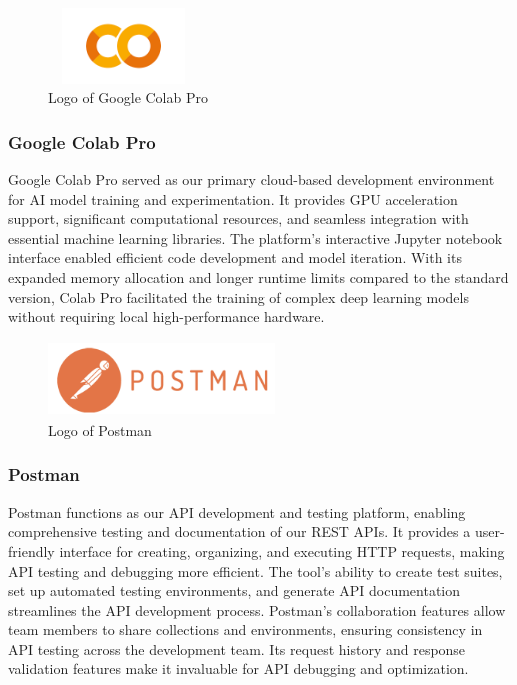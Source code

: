         \begin{figure}[htbp]
            \centerline{\includegraphics[width=4cm, height=2cm]{Images/logo/google colab pro.png}}
            \caption{Logo of Google Colab Pro}
            \label{fig}
        \end{figure}
        \subsubsection{Google Colab Pro}
            Google Colab Pro served as our primary cloud-based development environment for AI model training and experimentation. It provides GPU acceleration support, significant computational resources, and seamless integration with essential machine learning libraries. The platform's interactive Jupyter notebook interface enabled efficient code development and model iteration. With its expanded memory allocation and longer runtime limits compared to the standard version, Colab Pro facilitated the training of complex deep learning models without requiring local high-performance hardware.

        \begin{figure}[htbp]
            \centerline{\includegraphics[width=6cm, height=2cm]{Images/logo/postman.png}}
            \caption{Logo of Postman}
            \label{fig}
        \end{figure}
        \subsubsection{Postman}
            Postman functions as our API development and testing platform, enabling comprehensive testing and documentation of our REST APIs. It provides a user-friendly interface for creating, organizing, and executing HTTP requests, making API testing and debugging more efficient. The tool's ability to create test suites, set up automated testing environments, and generate API documentation streamlines the API development process. Postman's collaboration features allow team members to share collections and environments, ensuring consistency in API testing across the development team. Its request history and response validation features make it invaluable for API debugging and optimization.

